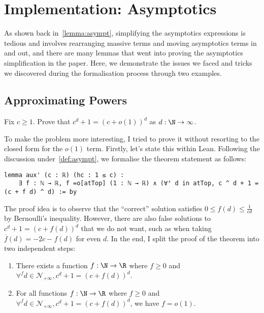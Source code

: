 \section{Implementation: Asymptotics} \label{sec:impl_asymptotics}

As shown back in~\cref{lemma:asympt}, simplifying the asymptotics expressions is tedious and involves rearranging massive terms and moving asymptotics terms in and out, and there are many lemmas that went into proving the asymptotics simplification in the paper. Here, we demonstrate the issues we faced and tricks we discovered during the formalisation process through two examples.

\subsection{Approximating Powers}

\begin{theorem}{}{}
  Fix \(c \geq 1\). Prove that \(c^d + 1 = (c + o(1))^d\) as \(d : \N \to \infty\).
\end{theorem}

To make the problem more interesting, I tried to prove it without resorting to the closed form for the \(o(1)\) term. Firstly, let's state this within Lean. Following the discussion under~\cref{def:asympt}, we formalise the theorem statement as follows:

\begin{verbatim}
lemma aux' (c : ℝ) (hc : 1 ≤ c) :
    ∃ f : ℕ → ℝ, f =o[atTop] (1 : ℕ → ℝ) ∧ (∀ᶠ d in atTop, c ^ d + 1 = (c + f d) ^ d) := by
\end{verbatim}

The proof idea is to observe that the ``correct'' solution satisfies \(0 \leq f(d) \leq \frac{1}{cd}\) by Bernoulli's inequality. However, there are also false solutions to \(c^d + 1 = (c + f(d))^d\) that we do not want, such as when taking \(\overline{f}(d) = -2c - f(d)\) for even \(d\). In the end, I split the proof of the theorem into two independent steps:

\begin{enumerate}
  \item There exists a function \(f : \N \to \R\) where \(f \geq 0\) and \(\forall^f d \in \mathcal{N}_{+\infty}, c^d + 1 = (c + f(d))^d\).
  \item For all functions \(f : \N \to \R\) where \(f \geq 0\) and \(\forall^f d \in \mathcal{N}_{+\infty}, c^d + 1 = (c + f(d))^d\), we have \(f = o(1)\).
\end{enumerate}

